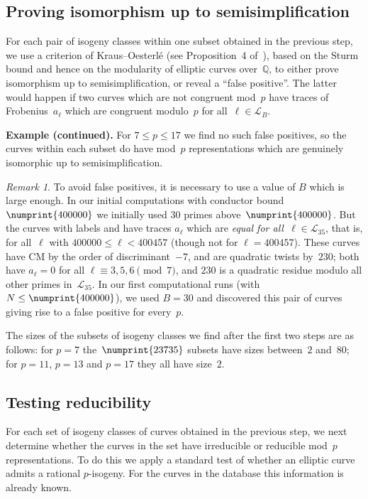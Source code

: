 \documentclass[twoside,leqno,symbols-for-thanks, draft]{rmi}
\numberwithin{equation}{section}
\newcommand{\lmfdbec}[3]{\href{http://www.lmfdb.org/EllipticCurve/Q/#1#2#3}{{\text{\rm#1#2#3}}}}
\newcommand{\Q}{\mathbb{Q}}
\newcommand{\calL}{\mathcal{L}}
\theoremstyle{remark}
\newtheorem{remark}[theorem]{Remark}
\begin{document}
\subsection{Proving isomorphism up to semisimplification}

For each pair of isogeny classes within one subset obtained in the
previous step, we use a criterion of Kraus--Oesterl\'e (see
Proposition~4 of~\cite{KO}), based on the Sturm bound and hence on the
modularity of elliptic curves over~$\Q$, to either prove isomorphism
up to semisimplification, or reveal a ``false positive''.  The latter
would happen if two curves which are not congruent mod~$p$ have traces
of Frobenius~$a_{\ell}$ which are congruent modulo~$p$ for
all~$\ell\in\calL_B$.

{\bf Example (continued).}  For $7\le p\le17$ we find no such false
positives, so the curves within each subset do have mod~$p$
representations which are genuinely isomorphic up to
semisimplification.

\begin{remark}
  To avoid false positives, it is necessary to use a value of $B$
  which is large enough.  In our initial computations with conductor
  bound~$\numprint{400000}$ we initially used 30 primes
  above~$\numprint{400000}$. But the curves with labels
  \lmfdbec{25921}{a}{1} and \lmfdbec{78400}{gw}{1} have traces
  $a_{\ell}$ which are \emph{equal for all~$\ell\in\calL_{35}$}, that
  is, for all~$\ell$ with $400000\le \ell<400457$ (though not for
  $\ell=400457$).  These curves have CM by the order of
  discriminant~$-7$, and are quadratic twists by~$230$; both have
  $a_\ell=0$ for all $\ell\equiv3,5,6\pmod{7}$, and $230$ is a
  quadratic residue modulo all other primes in~$\calL_{35}$. In our
  first computational runs (with $N\le\numprint{400000}$), we used
  $B=30$ and discovered this pair of curves giving rise to a false
  positive for every~$p$.
\end{remark}

The sizes of the subsets of isogeny classes we find after the first
two steps are as follows: for $p=7$ the~$\numprint{23735}$ subsets
have sizes between~$2$ and~$80$; for $p=11$, $p=13$ and $p=17$ they
all have size~$2$.

\subsection{Testing reducibility}
For each set of isogeny classes of curves obtained in the previous
step, we next determine whether the curves in the set have irreducible
or reducible mod~$p$ representations.  To do this we apply a standard
test of whether an elliptic curve admits a rational $p$-isogeny.  For
the curves in the database this information is already known.
\end{document}
